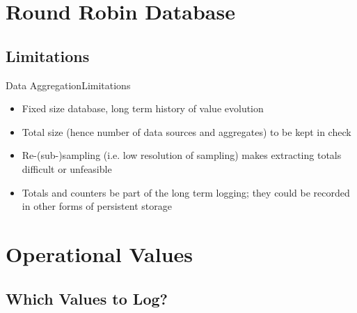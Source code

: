 \documentclass[t, 9pt, aspectratio=169]{beamer}
\begin{document}
    \section{Round Robin Database}
    \subsection{Limitations}
    
    \begin{frame}{Data Aggregation}{Limitations}
        \begin{itemize}
            \item Fixed size database\footnotemark, long term history of value evolution
            \item Total size (hence number of data sources and aggregates) to be kept in check
            \item Re-(sub-)sampling (i.e. low resolution of sampling) makes extracting totals difficult or unfeasible
            \item Totals and counters  be part of the long term logging; they could be recorded in other forms of persistent storage
        \end{itemize}
    \end{frame}

    \section{Operational Values}
    \subsection{Which Values to Log?}
    
\end{document}
